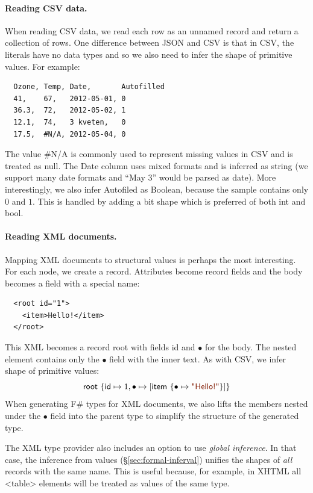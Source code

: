 \documentclass[10pt,preprint,blind,clearpagebib]{sigplanconf}
\newcommand{\kvd}[1]{\textnormal{\textcolor{kvdclr}{\sffamily #1}}}
\newcommand{\str}[1]{\textnormal{\textcolor{strclr}{\sffamily "#1"}}}
\newcommand{\ident}[1]{\textnormal{\sffamily #1}}
\begin{document}
\paragraph{Reading CSV data.}
When reading CSV data, we read each row as an unnamed record and return a collection of rows.
One difference between JSON and CSV is that in CSV, the literals have no data types and so 
we also need to infer the shape of primitive values. For example:
%
{\small{
\begin{verbatim}
  Ozone, Temp, Date,       Autofilled
  41,    67,   2012-05-01, 0
  36.3,  72,   2012-05-02, 1
  12.1,  74,   3 kveten,   0
  17.5,  #N/A, 2012-05-04, 0
\end{verbatim}
}}
%
\noindent
The value {\small\ttfamily \#N/A} is commonly used to represent missing values in CSV and is treated
as \kvd{null}. The \ident{Date} column uses mixed formats and is inferred as \ident{string} 
(we support many date formats and ``May 3'' would be parsed as date). More interestingly,
we also infer \ident{Autofiled} as Boolean, because the sample contains only $0$ and $1$.
This is handled by adding a \ident{bit} shape which is preferred of both \ident{int} and \ident{bool}.

\paragraph{Reading XML documents.}
Mapping XML documents to structural values is perhaps the most interesting. For each node, we
create a record. Attributes become record fields and the body becomes a field with a special
name:
%
{\small{
\begin{verbatim}
  <root id="1">
    <item>Hello!</item>
  </root>    
\end{verbatim}
}}
%
\noindent
This XML becomes a record \ident{root} with fields \ident{id} and $\bullet$ for the body. 
The nested element contains only the $\bullet$ field with the inner text. As with CSV, we
infer shape of primitive values:
%
\begin{equation*}
\ident{root}~\{ \ident{id} \mapsto 1, \bullet \mapsto [ \ident{item}~\{ \bullet \mapsto \str{Hello!} \}] \}
\end{equation*}
%
When generating F\# types for XML documents, we also lifts the members nested under the $\bullet$ 
field into the parent type to simplify the structure of the generated type.

The XML type provider also includes an option to use \emph{global inference}. In that case, 
the inference from values (\S\ref{sec:formal-inferval}) unifies the shapes of \emph{all} records with the 
same name. This is useful because, for example, in XHTML all {\small\ttfamily <table>} elements
will be treated as values of the same type.
\end{document}

